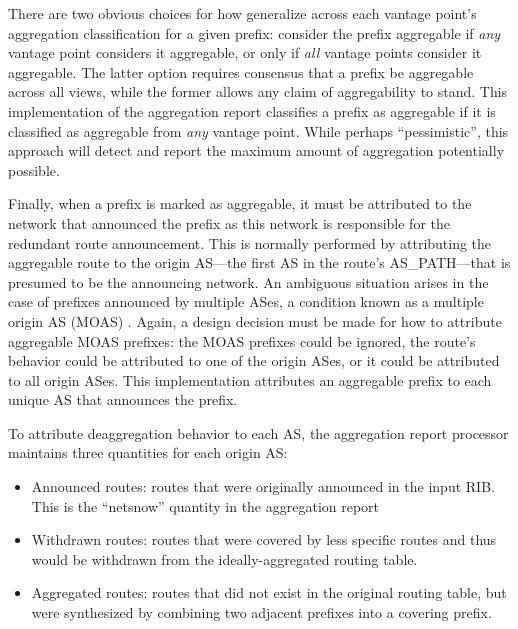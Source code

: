 There are two obvious choices for how generalize across each vantage point's aggregation classification for a given prefix: consider the prefix aggregable if \emph{any} vantage point considers it aggregable, or only if \emph{all} vantage points consider it aggregable. The latter option requires consensus that a prefix be aggregable across all views, while the former allows any claim of aggregability to stand. This implementation of the aggregation report classifies a prefix as aggregable if it is classified as aggregable from \emph{any} vantage point. While perhaps ``pessimistic'', this approach will detect and report the maximum amount of aggregation potentially possible.


Finally, when a prefix is marked as aggregable, it must be attributed to the network that announced the prefix as this network is responsible for the redundant route announcement. This is normally performed by attributing the aggregable route to the origin AS---the first AS in the route's AS\_PATH---that is presumed to be the announcing network. An ambiguous situation arises in the case of prefixes announced by multiple ASes, a condition known as a multiple origin AS (MOAS) \cite{Zhao:2001ly}. Again, a design decision must be made for how to attribute aggregable MOAS prefixes: the MOAS prefixes could be ignored, the route's behavior could be attributed to one of the origin ASes, or it could be attributed to all origin ASes. This implementation attributes an aggregable prefix to each unique AS that announces the prefix.

To attribute deaggregation behavior to each AS, the aggregation report processor maintains three quantities for each origin AS:

\begin{itemize}
\item{Announced routes: routes that were originally announced in the input RIB. This is the ``netsnow'' quantity in the aggregation report}
\item{Withdrawn routes: routes that were covered by less specific routes and thus would be withdrawn from the ideally-aggregated routing table.}
\item{Aggregated routes: routes that did not exist in the original routing table, but were synthesized by combining two adjacent prefixes into a covering prefix.}
\end{itemize}


